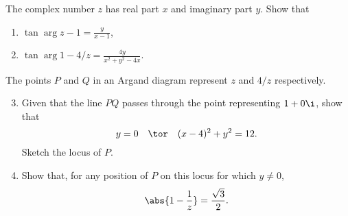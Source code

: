 \begin{problem}
    The complex number $z$ has real part $x$ and imaginary part $y$. Show that
    \begin{enumerate}
        \item $\tan{\arg{z-1}} = \frac{y}{x-1}$,
        \item $\tan{\arg{1 - 4/z}} = \frac{4y}{x^2 + y^2 - 4x}$.
    \end{enumerate}

    The points $P$ and $Q$ in an Argand diagram represent $z$ and $4/z$ respectively.
    \begin{enumerate}
        \setcounter{enumi}{2}
        \item Given that the line $PQ$ passes through the point representing $1 + 0\i$, show that \[y = 0 \quad \tor \quad (x-4)^2 + y^2 = 12.\] Sketch the locus of $P$.
        \item Show that, for any position of $P$ on this locus for which $y \neq 0$, \[\abs{1 - \frac1z} = \frac{\sqrt3}{2}.\]
    \end{enumerate}
\end{problem}
